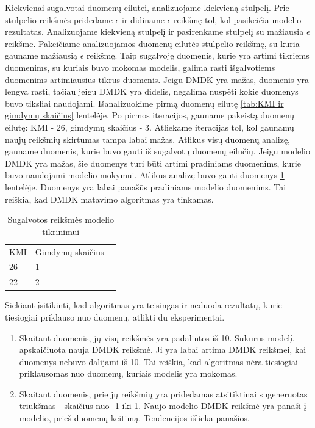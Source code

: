 \documentclass{VUMIFInfBakalaurinis}
\begin{document}
\par Kiekvienai sugalvotai duomenų eilutei, analizuojame kiekvieną stulpelį. Prie stulpelio reikšmės pridedame $\epsilon$ ir didiname $\epsilon$ reikšmę tol, kol pasikeičia modelio rezultatas. Analizuojame kiekvieną stulpelį ir pasirenkame stulpelį su mažiausia $\epsilon$ reikšme. Pakeičiame analizuojamos duomenų eilutės stulpelio reikšmę, su kuria gauname mažiausią $\epsilon$ reikšmę. Taip sugalvoję duomenis, kurie yra artimi tikriems duomenims, su kuriais buvo mokomas modelis,  galima rasti išgalvotiems duomenims artimiausius tikrus duomenis. Jeigu DMDK yra mažas, duomenis yra lengva rasti, tačiau jeigu DMDK yra didelis, negalima nuspėti kokie duomenys buvo tiksliai naudojami. Išanalizuokime pirmą duomenų eilutę \ref{tab:KMI ir gimdymų skaičius} lentelėje. Po pirmos iteracijos, gauname pakeistą duomenų eilutę: KMI - 26, gimdymų skaičius - 3. Atliekame iteracijas tol, kol gaunamų naujų reikšmių skirtumas tampa labai mažas. Atlikus visų duomenų analizę, gauname duomenis, kurie buvo gauti iš sugalvotų duomenų eilučių. Jeigu modelio DMDK yra mažas, šie duomenys turi būti artimi pradiniams duomenims, kurie buvo naudojami modelio mokymui. Atlikus analizę buvo gauti duomenys \ref{tab:Duomenu tikrinimas} lentelėje. Duomenys yra labai panašūs pradiniams modelio duomenims. Tai reiškia, kad DMDK matavimo algoritmas yra tinkamas.

\begin{table}[h]
\centering
\begin{tabular}{|l|l|l|}
\cline{1-2}
KMI & Gimdymų skaičius \\\cline{1-2}
26      & 1 \\\cline{1-2}
22       & 2 \\\cline{1-2}
\end{tabular}
\caption{Sugalvotos reikšmės modelio tikrinimui}
\label{tab:Duomenu tikrinimas}
\end{table}

\par Siekiant įsitikinti, kad algoritmas yra teisingas ir neduoda rezultatų, kurie tiesiogiai priklauso nuo duomenų, atlikti du eksperimentai.

\begin{enumerate}
    \item Skaitant duomenis, jų visų reikšmės yra padalintos iš 10. Sukūrus modelį, apskaičiuota nauja DMDK reikšmė. Ji yra labai artima DMDK reikšmei, kai duomenys nebuvo dalijami iš 10. Tai reiškia, kad algoritmas nėra tiesiogiai priklausomas nuo duomenų, kuriais modelis yra mokomas.
    \item Skaitant duomenis, prie jų reikšmių yra pridedamas atsitiktinai sugeneruotas triukšmas - skaičius nuo -1 iki 1. Naujo modelio DMDK reikšmė yra panaši į modelio, prieš duomenų keitimą. Tendencijos išlieka panašios.
\end{enumerate}
\end{document}
